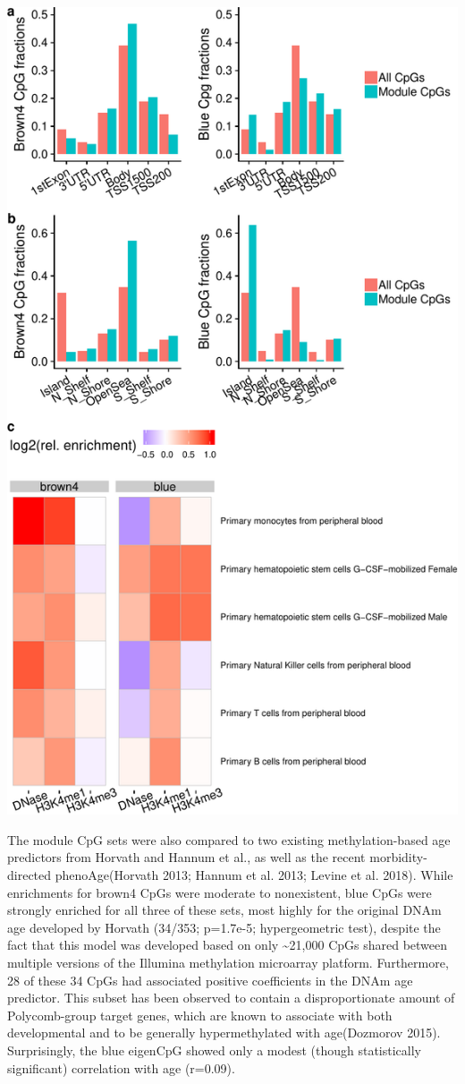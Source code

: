 \documentclass[]{article}
\theoremstyle{definition}
\theoremstyle{definition}
\theoremstyle{definition}
\theoremstyle{remark}
\begin{document}
\includegraphics{../doc/figures/brown-and-blue-plots-1.pdf}

The module CpG sets were also compared to two existing methylation-based
age predictors from Horvath and Hannum et al., as well as the recent
morbidity-directed phenoAge(Horvath 2013; Hannum et al. 2013; Levine et
al. 2018). While enrichments for brown4 CpGs were moderate to
nonexistent, blue CpGs were strongly enriched for all three of these
sets, most highly for the original DNAm age developed by Horvath
(34/353; p=1.7e-5; hypergeometric test), despite the fact that this
model was developed based on only \textasciitilde{}21,000 CpGs shared
between multiple versions of the Illumina methylation microarray
platform. Furthermore, 28 of these 34 CpGs had associated positive
coefficients in the DNAm age predictor. This subset has been observed to
contain a disproportionate amount of Polycomb-group target genes, which
are known to associate with both developmental and to be generally
hypermethylated with age(Dozmorov 2015). Surprisingly, the blue eigenCpG
showed only a modest (though statistically significant) correlation with
age (r=0.09).
\end{document}
